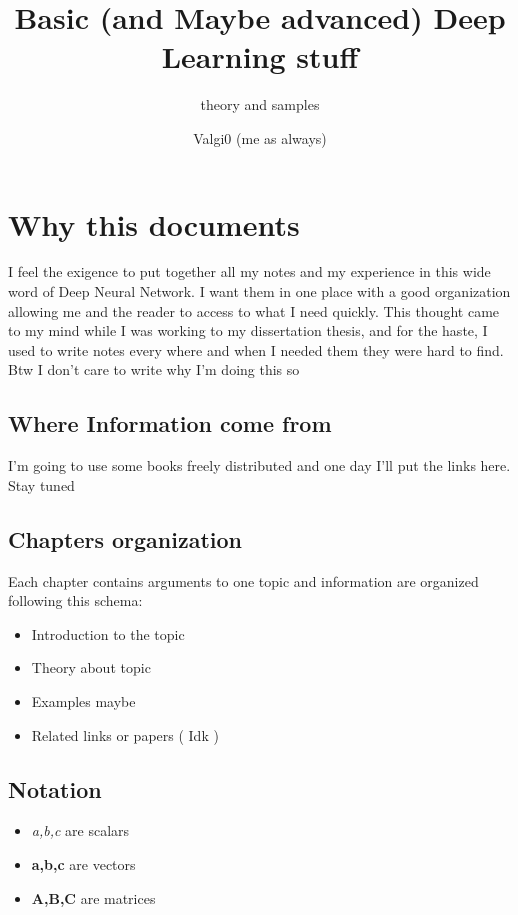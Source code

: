\documentclass[12pt,a4paper,twoside,openright]{scrbook}
\title{Basic (and Maybe advanced) Deep Learning stuff }
\subtitle{theory and samples}
\author{Valgi0 (me as always)}
\begin{document}
\frontmatter 

\maketitle


\newpage

\tableofcontents

\newpage

\listoffigures

\mainmatter

\pagestyle{fancy} 
\fancyhead[LO]{\nouppercase{\rightmark}}
\fancyhead[RE]{\nouppercase{\leftmark}}
\fancyhead[LE,RO]{\thepage}
\fancyfoot{}

\chapter{Why this documents}
I feel the exigence to put together all my notes and my experience in this wide word of Deep Neural Network. I want them in one place with a good organization allowing me and the reader to access to what I need quickly. This thought came to my mind while I was working to my dissertation thesis, and for the haste, I used to write notes every where and when I needed them they were hard to find. Btw I don't care to write why I'm doing this so

\section{Where Information come from}
I'm going to use some books freely distributed and one day I'll put the links here. Stay tuned

\section{Chapters organization}
Each chapter contains arguments to one topic and information are organized following this schema:
\begin{itemize}
\item Introduction to the topic
\item Theory about topic
\item Examples maybe
\item Related links or papers ( Idk )
\end{itemize}

\section{Notation}
\begin{itemize}
\item \textit{a,b,c} are scalars
\item \textbf{a,b,c} are vectors
\item \textbf{A,B,C} are matrices
\end{itemize}
\end{document}
